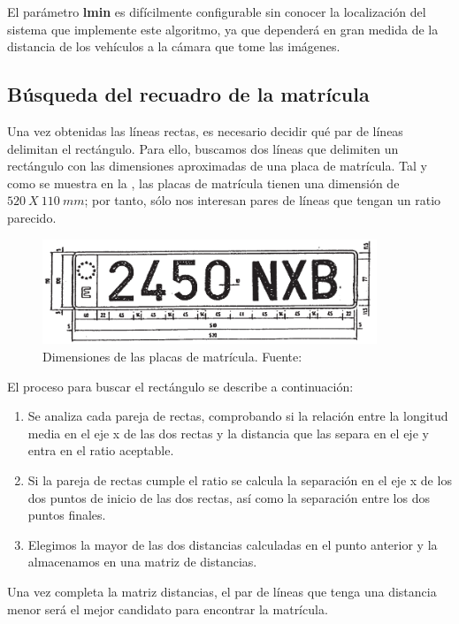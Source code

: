 El parámetro \textbf{lmin} es difícilmente configurable sin conocer la localización del sistema que implemente este algoritmo, ya que dependerá en gran medida de la distancia de los vehículos a la cámara que tome las imágenes.


\subsection{Búsqueda del recuadro de la matrícula}
Una vez obtenidas las líneas rectas, es necesario decidir qué par de líneas delimitan el rectángulo. Para ello, buscamos dos líneas que delimiten un rectángulo con las dimensiones aproximadas de una placa de matrícula. Tal y como se muestra en la , las placas de matrícula tienen una dimensión de $520~X~110~mm$; por tanto, sólo nos interesan pares de líneas que tengan un ratio parecido.

\begin{figure}[!h]
\centering
\includegraphics[width=10cm]{boe.png}
\caption{\small{Dimensiones de las placas de matrícula. Fuente:\cite{boe}}}
\label{dimMat}
\end{figure}

El proceso para buscar el rectángulo se describe a continuación:
\begin{enumerate}
\item Se analiza cada pareja de rectas, comprobando si la relación entre la longitud media en el eje x de las dos rectas y la distancia que las separa en el eje y entra en el ratio aceptable.

\item Si la pareja de rectas cumple el ratio se calcula la separación en el eje x de los dos puntos de inicio de las dos rectas, así como la separación entre los dos puntos finales.

\item Elegimos la mayor de las dos distancias calculadas en el punto anterior y la almacenamos en una matriz de distancias.
\end{enumerate}

Una vez completa la matriz distancias, el par de líneas que tenga una distancia menor será el mejor candidato para encontrar la matrícula.

